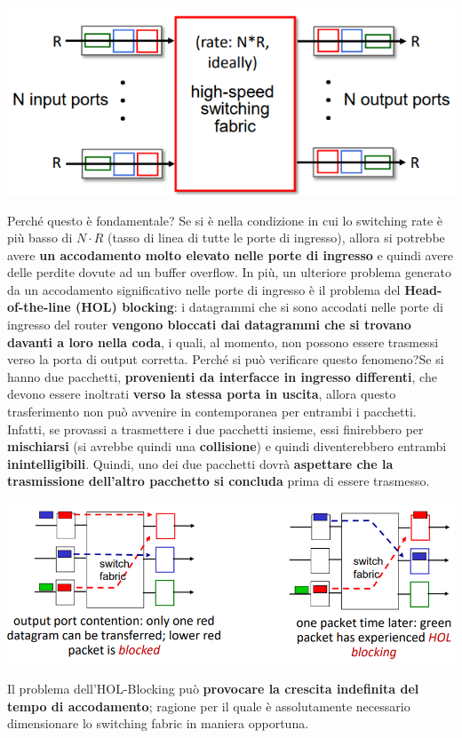 \documentclass[12pt]{article}
\begin{document}
\begin{center}
    \includegraphics[width = 0.70\linewidth]{Images/79.png}
\end{center}
Perché questo è fondamentale? Se si è nella condizione in cui lo switching rate è più basso di $N \cdot R$ (tasso di linea di tutte le porte di ingresso), allora si potrebbe avere 
\textbf{un accodamento molto elevato nelle porte di ingresso} e quindi avere delle perdite dovute ad un buffer overflow. In più, un ulteriore problema generato da un accodamento significativo nelle porte
di ingresso è il problema del \textbf{Head-of-the-line (HOL) blocking}: i datagrammi che si sono accodati nelle porte di ingresso del router \textbf{vengono bloccati dai datagrammi che si trovano davanti a loro nella coda}, i quali, al momento, non possono essere trasmessi verso la porta di output corretta.
Perché si può verificare questo fenomeno?Se si hanno due pacchetti, \textbf{provenienti da interfacce in ingresso differenti}, che devono essere inoltrati \textbf{verso la stessa porta in uscita}, allora questo
trasferimento non può avvenire in contemporanea per entrambi i pacchetti. Infatti, se provassi a trasmettere i due pacchetti insieme, essi finirebbero per \textbf{mischiarsi} (si avrebbe quindi una \textbf{collisione}) e quindi diventerebbero entrambi \textbf{inintelligibili}.
Quindi, uno dei due pacchetti dovrà \textbf{aspettare che la trasmissione dell'altro pacchetto si concluda} prima di essere trasmesso. 
\begin{center}
    \includegraphics[width = 0.901\linewidth]{Images/80.png}
\end{center}
Il problema dell'HOL-Blocking può \textbf{provocare la crescita indefinita del tempo di accodamento}; ragione per il quale è assolutamente necessario dimensionare lo switching fabric in maniera opportuna. \newline
\end{document}
